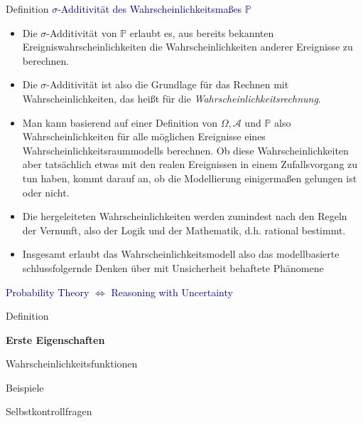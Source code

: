 \documentclass[
  8pt,
  ignorenonframetext,
]{beamer}
\begin{document}
\begin{frame}{Definition}
\protect\hypertarget{definition-8}{}
\textcolor{darkblue}{$\sigma$-Additivität des Wahrscheinlichkeitsmaßes $\mathbb{P}$}
\small

\begin{itemize}
\justifying
\itemsep2mm
\item Die $\sigma$-Additivität von $\mathbb{P}$ erlaubt es, aus bereits bekannten
  Ereigniswahrscheinlichkeiten die Wahrscheinlichkeiten anderer Ereignisse zu berechnen.
\item Die $\sigma$-Additivität ist also die Grundlage für das Rechnen mit Wahrscheinlichkeiten,
  das heißt für die \textit{Wahrscheinlichkeitsrechnung}.
\item Man kann basierend auf einer Definition von $\Omega, \mathcal{A}$ und $\mathbb{P}$ also
  Wahrscheinlichkeiten für alle möglichen Ereignisse eines Wahrscheinlichkeitsraummodells berechnen.
  Ob diese Wahrscheinlichkeiten aber tatsächlich etwas mit den realen Ereignissen 
  in einem Zufallsvorgang zu tun haben, kommt darauf an, ob die Modellierung 
  einigermaßen gelungen ist oder nicht.
\item Die hergeleiteten Wahrscheinlichkeiten werden zumindest nach den Regeln der Vernunft, 
  also der Logik und der Mathematik, d.h. rational bestimmt.
\item Insgesamt erlaubt das Wahrscheinlichkeitsmodell also das modellbasierte 
  schlussfolgernde Denken über mit Unsicherheit behaftete Phänomene
\end{itemize}

\center
\normalsize

\textcolor{darkblue}{Probability Theory $\Leftrightarrow$ Reasoning with Uncertainty}
\end{frame}

\begin{frame}{}
\protect\hypertarget{section-7}{}
\large
\vfill

Definition

\textbf{Erste Eigenschaften}

Wahrscheinlichkeitsfunktionen

Beispiele

Selbstkontrollfragen \vfill
\end{frame}
\end{document}
